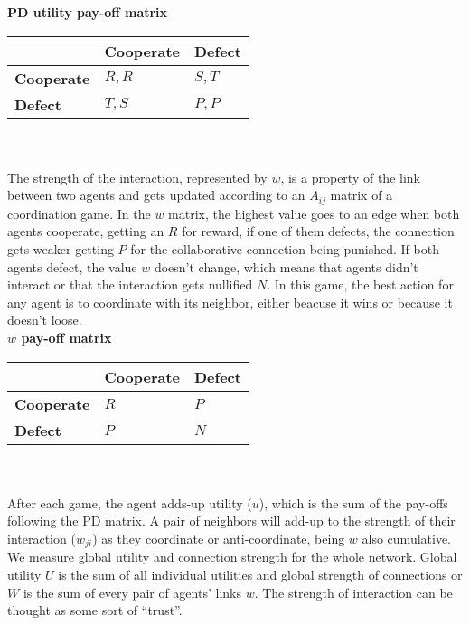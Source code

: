 \documentclass{bmcart}
\begin{document}
{\bf PD utility pay-off matrix}\\

\begin{tabular}{| l | l | l |}
\hline
          & \bf{Cooperate} & \bf{Defect} \\ \hline
\bf{Cooperate} &  $R,R$      &  $S,T$   \\ \hline
\bf{Defect}    &  $T,S$      &  $P,P$   \\ \hline

\end{tabular}\\ \\

The strength of the interaction, represented by $w$, is a property of the link between two agents and
gets updated according to an $A_{ij}$ matrix of a coordination game. In the $w$ matrix, the highest value
goes to an edge when both agents cooperate, getting an $R$ for reward, if one of
them defects, the connection gets weaker getting $P$ for the collaborative
connection being punished. If both agents defect, the value $w$ doesn't change,
which means that agents didn't interact or that the interaction gets nullified
$N$. In this game, the best action for any agent is to coordinate with its
neighbor, either beacuse it wins or because it doesn't loose. \\ 

{\bf $w$ pay-off matrix}\\

\begin{tabular}{| l | l | l |}
\hline
          & \bf{Cooperate} & \bf{Defect} \\ \hline
\bf{Cooperate} &  $R$      &  $P$   \\ \hline
\bf{Defect}    &  $P$      &  $N$   \\ \hline

\end{tabular}\\ \\


After each game, the agent adds-up utility ($u$), which is the sum of the
pay-offs following the PD matrix. A pair of neighbors will add-up to the strength of
their interaction ($w_{ji}$) as they coordinate or anti-coordinate, being $w$
also cumulative. We measure global utility and connection strength for the whole
network. Global utility $U$ is the sum of all individual utilities and global
strength of connections or $W$ is the sum of every pair of agents' links
$w$. The strength of interaction can be thought as some sort of ``trust''.\\
\end{document}
